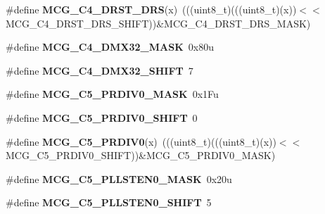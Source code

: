 \begin{DoxyCompactItemize}
\item 
\#define {\bfseries M\+C\+G\+\_\+\+C4\+\_\+\+D\+R\+S\+T\+\_\+\+D\+RS}(x)~(((uint8\+\_\+t)(((uint8\+\_\+t)(x))$<$$<$M\+C\+G\+\_\+\+C4\+\_\+\+D\+R\+S\+T\+\_\+\+D\+R\+S\+\_\+\+S\+H\+I\+FT))\&M\+C\+G\+\_\+\+C4\+\_\+\+D\+R\+S\+T\+\_\+\+D\+R\+S\+\_\+\+M\+A\+SK)\hypertarget{group__MCG__Register__Masks_gaf074d694a596e6e92614fd435c9ccb35}{}\label{group__MCG__Register__Masks_gaf074d694a596e6e92614fd435c9ccb35}

\item 
\#define {\bfseries M\+C\+G\+\_\+\+C4\+\_\+\+D\+M\+X32\+\_\+\+M\+A\+SK}~0x80u\hypertarget{group__MCG__Register__Masks_ga5d16ac35cf87b3cdeeefca1c16a0eda0}{}\label{group__MCG__Register__Masks_ga5d16ac35cf87b3cdeeefca1c16a0eda0}

\item 
\#define {\bfseries M\+C\+G\+\_\+\+C4\+\_\+\+D\+M\+X32\+\_\+\+S\+H\+I\+FT}~7\hypertarget{group__MCG__Register__Masks_ga12d73b2d4a4fd1f2fb21a1cbe87aaa83}{}\label{group__MCG__Register__Masks_ga12d73b2d4a4fd1f2fb21a1cbe87aaa83}

\item 
\#define {\bfseries M\+C\+G\+\_\+\+C5\+\_\+\+P\+R\+D\+I\+V0\+\_\+\+M\+A\+SK}~0x1\+Fu\hypertarget{group__MCG__Register__Masks_ga28ab0b9007f9941707395660db088172}{}\label{group__MCG__Register__Masks_ga28ab0b9007f9941707395660db088172}

\item 
\#define {\bfseries M\+C\+G\+\_\+\+C5\+\_\+\+P\+R\+D\+I\+V0\+\_\+\+S\+H\+I\+FT}~0\hypertarget{group__MCG__Register__Masks_ga452026beec3bec5a580d151e15d83f30}{}\label{group__MCG__Register__Masks_ga452026beec3bec5a580d151e15d83f30}

\item 
\#define {\bfseries M\+C\+G\+\_\+\+C5\+\_\+\+P\+R\+D\+I\+V0}(x)~(((uint8\+\_\+t)(((uint8\+\_\+t)(x))$<$$<$M\+C\+G\+\_\+\+C5\+\_\+\+P\+R\+D\+I\+V0\+\_\+\+S\+H\+I\+FT))\&M\+C\+G\+\_\+\+C5\+\_\+\+P\+R\+D\+I\+V0\+\_\+\+M\+A\+SK)\hypertarget{group__MCG__Register__Masks_gaff29a787086eaba9ef46f4e873d83a54}{}\label{group__MCG__Register__Masks_gaff29a787086eaba9ef46f4e873d83a54}

\item 
\#define {\bfseries M\+C\+G\+\_\+\+C5\+\_\+\+P\+L\+L\+S\+T\+E\+N0\+\_\+\+M\+A\+SK}~0x20u\hypertarget{group__MCG__Register__Masks_ga9bec4ed23caf6a431b506e944d928080}{}\label{group__MCG__Register__Masks_ga9bec4ed23caf6a431b506e944d928080}

\item 
\#define {\bfseries M\+C\+G\+\_\+\+C5\+\_\+\+P\+L\+L\+S\+T\+E\+N0\+\_\+\+S\+H\+I\+FT}~5\hypertarget{group__MCG__Register__Masks_ga486796db598fbf2f07f39d71453f49b6}{}\label{group__MCG__Register__Masks_ga486796db598fbf2f07f39d71453f49b6}


\end{DoxyCompactItemize}
